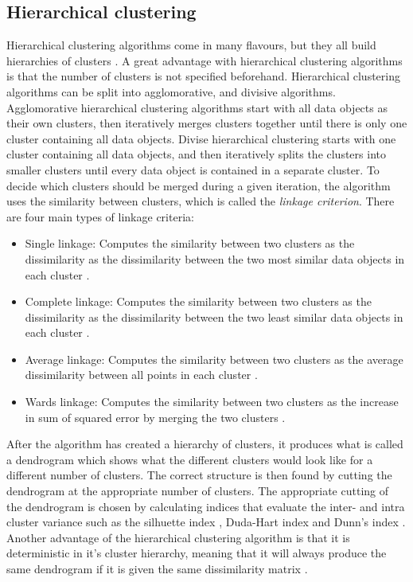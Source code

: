 \subsection{Hierarchical clustering}
Hierarchical clustering algorithms come in many flavours, but they all build hierarchies of clusters \cite{espen}.
A great advantage with hierarchical clustering algorithms is that the number of clusters is not specified beforehand. 
Hierarchical clustering algorithms can be split into agglomorative, and divisive algorithms.
Agglomorative hierarchical clustering algorithms start with all data objects as their own clusters, then iteratively merges clusters together until there is only one cluster containing all data objects.
Divise hierarchical clustering starts with one cluster containing all data objects, and then iteratively splits the clusters into smaller clusters until every data object is contained in a separate cluster.
To decide which clusters should be merged during a given iteration, the algorithm uses the similarity between clusters, which is called the \textit{linkage criterion}.
There are four main types of linkage criteria: 
\begin{itemize}
    \item Single linkage:   Computes the similarity between two clusters as the dissimilarity as the dissimilarity between the two most similar data objects in each cluster \cite{dependency_tsc_energy_markets}.
    \item Complete linkage: Computes the similarity between two clusters as the dissimilarity as the dissimilarity between the two least similar data objects in each cluster \cite{financial_tsc_variance_ratio}.
    \item Average linkage:  Computes the similarity between two clusters as the average dissimilarity between all points in each cluster \cite{dependency_tsc_energy_markets}.
    \item Wards linkage:    Computes the similarity between two clusters as the increase in sum of squared error by merging the two clusters \cite{copula_ica_tsc}.
\end{itemize}

After the algorithm has created a hierarchy of clusters, it produces what is called a dendrogram which shows what the different clusters would look like for a different number of clusters. 
The correct structure is then found by cutting the dendrogram at the appropriate number of clusters. 
The appropriate cutting of the dendrogram is chosen by calculating indices that evaluate the inter- and intra cluster variance such as the silhuette index \cite{BSLEX_nonlin_nonstat_tsc, copula_ica_tsc}, Duda-Hart index \cite{financial_tsc_variance_ratio} and Dunn's index \cite{tsc_total_variation_distance}.
Another advantage of the hierarchical clustering algorithm is that it is deterministic in it's cluster hierarchy, 
meaning that it will always produce the same dendrogram if it is given the same dissimilarity matrix \cite{espen}.

